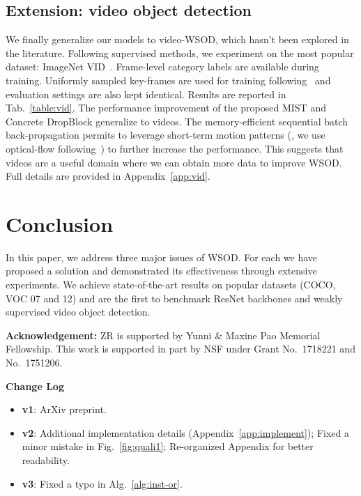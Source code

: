 \documentclass[10pt,twocolumn,letterpaper]{article}
\begin{document}
\subsection{Extension: video object detection}
\label{sec:video}

We finally generalize our models to video-WSOD, which hasn't been explored in the literature. Following supervised methods, we experiment on the most popular dataset: ImageNet VID~\cite{imagenet}. Frame-level category labels are available during training. Uniformly sampled key-frames are used for training following~\cite{zhu17fgfa} and evaluation settings are also kept identical. Results are reported in Tab.~\ref{table:vid}. The performance improvement of the proposed MIST and Concrete DropBlock  generalize to  videos. The memory-efficient sequential batch back-propagation permits to leverage  short-term motion patterns (\ie,  we use optical-flow following~\cite{zhu17fgfa}) to further increase the performance. This suggests that videos are a useful domain where we can obtain more data to improve WSOD. Full details are provided in Appendix~\ref{app:vid}.

 \vspace{-0.5em}
\section{Conclusion}
In this paper, we address three major issues of WSOD. For each we have proposed a solution and demonstrated its effectiveness through extensive experiments. We achieve state-of-the-art results on popular datasets (COCO, VOC 07 and 12) and are the first to benchmark ResNet backbones and weakly supervised video object detection.
 
\vspace{0.3em}
\noindent\textbf{Acknowledgement:} ZR is supported by Yunni \& Maxine Pao Memorial Fellowship. This work is supported in part by NSF under Grant No.\ 1718221 and  No.\ 1751206. 


{\small


}

\clearpage
{\centering \Large \textbf{Change Log}}
\begin{itemize}
    \item \textbf{v1}: ArXiv preprint. 
    \item \textbf{v2}: Additional implementation details (Appendix~\ref{app:implement}); Fixed a minor mistake in Fig.~\ref{fig:quali1}; Re-organized Appendix for better readability.
    \item \textbf{v3}: Fixed a typo in Alg.~\ref{alg:inst-or}.
\end{itemize}
\end{document}

